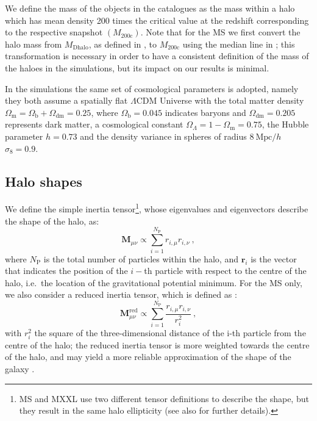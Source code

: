 \documentclass[a4paper,fleqn,usenatbib]{mnras}
\begin{document}
We define the mass of the objects in the catalogues as the mass within a halo which has mean density 200 times the critical value at the redshift corresponding to the respective snapshot $(M_{200\mathrm{c}})$. Note that for the MS we first convert the halo mass from $M_{\mathrm{Dhalo}}$, as defined in \citet{Jiangetal2014}, to $M_{200\mathrm{c}}$ using the median line in \citet[figure 2]{Jiangetal2014}; this transformation is necessary in order to have a consistent definition of the mass of the haloes in the simulations, but its impact on our results is minimal.

In the simulations the same set of cosmological parameters is adopted, namely they both assume a spatially flat $\Lambda$CDM Universe with the total matter density $\Omega_{\mathrm{m}} = \Omega_{\mathrm{b}} + \Omega_{\mathrm{dm}} = 0.25$, where $\Omega _{\mathrm{b}} = 0.045$ indicates baryons and $\Omega_{\mathrm{dm}} = 0.205$ represents dark matter, a cosmological constant $\Omega_{\Lambda} = 1 - \Omega_{\mathrm{m}} = 0.75$, the Hubble parameter $h = 0.73$ and the density variance in spheres of radius $8 \ \mbox{Mpc}/h$ $\sigma_8 = 0.9$. 

\subsection{Halo shapes}
\label{subsec:haloshapes}
We define the simple inertia tensor\footnote{MS and MXXL use two different tensor definitions to describe the shape, but they result in the same halo ellipticity (see also \citealt{Bettetal2007} for further details).}, whose eigenvalues and eigenvectors describe the shape of the halo, as:
\begin{equation}
    \mathbf{M}_{\mu \nu} \propto \sum_{i=1}^{N_{\mathrm{P}}} r_{i, \mu} r_{i, \nu} \ ,
	\label{eq:sit}
\end{equation}
where $N_{\mathrm{P}}$ is the total number of particles within the halo, and $\mathbf{r}_{i}$ is the vector that indicates the position of the $i-$th particle with respect to the centre of the halo, i.e.\ the location of the gravitational potential minimum. For the MS only, we also consider a reduced inertia tensor, which is defined as \citep{Pereiraetal2008}:
\begin{equation}
    \mathbf{M}_{\mu \nu}^{\mathrm{red}} \propto \sum _{i=1}^{N_{\mathrm{P}}} \frac{r_{i, \mu} r_{i, \nu}}{r_i^2} \ ,
	\label{eq:rit}
\end{equation}
with $r_i^2$ the square of the three-dimensional distance of the i-th particle from the centre of the halo; the reduced inertia tensor is more weighted towards the centre of the halo, and may yield a more reliable approximation of the shape of the galaxy \citep{Joachimietal2013b, Chisarietal2015}. 
\end{document}
